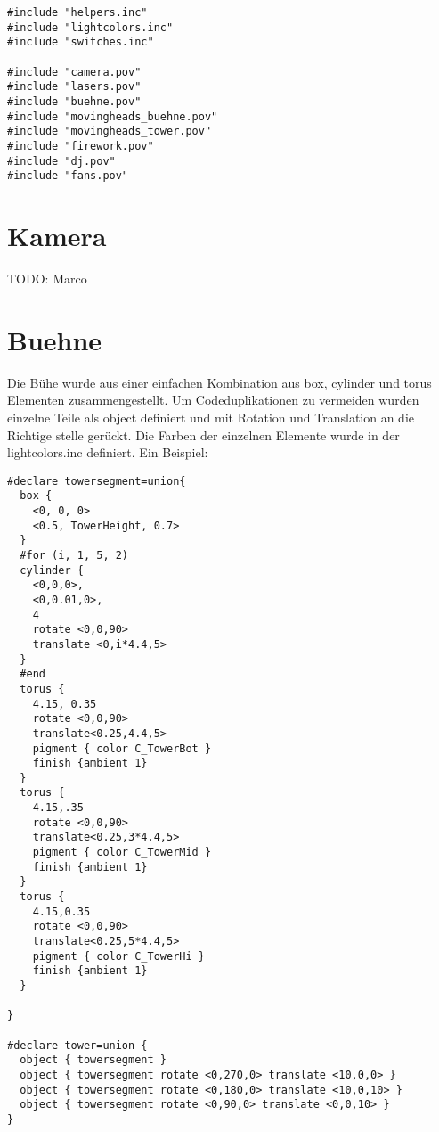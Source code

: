 \documentclass[paper=a4]{scrartcl}
\begin{document}
\begin{lstlisting}
#include "helpers.inc"
#include "lightcolors.inc"
#include "switches.inc"

#include "camera.pov"
#include "lasers.pov"
#include "buehne.pov"
#include "movingheads_buehne.pov"
#include "movingheads_tower.pov"
#include "firework.pov"
#include "dj.pov"
#include "fans.pov"
\end{lstlisting}

\section{Kamera}
TODO: Marco
\section{Buehne}
Die Bühe wurde aus einer einfachen Kombination aus box, cylinder und torus Elementen zusammengestellt. Um Codeduplikationen zu vermeiden wurden einzelne Teile als object definiert und mit Rotation und Translation an die Richtige stelle gerückt. Die Farben der einzelnen Elemente wurde in der lightcolors.inc definiert.
Ein Beispiel:
\begin{lstlisting}
#declare towersegment=union{
  box {
    <0, 0, 0>
    <0.5, TowerHeight, 0.7>
  }
  #for (i, 1, 5, 2)
  cylinder {
    <0,0,0>,
    <0,0.01,0>,
    4
    rotate <0,0,90>
    translate <0,i*4.4,5>
  }
  #end
  torus {
    4.15, 0.35
    rotate <0,0,90>
    translate<0.25,4.4,5>
    pigment { color C_TowerBot }
    finish {ambient 1}
  }
  torus {
    4.15,.35
    rotate <0,0,90>
    translate<0.25,3*4.4,5>
    pigment { color C_TowerMid }
    finish {ambient 1}
  }
  torus {
    4.15,0.35
    rotate <0,0,90>
    translate<0.25,5*4.4,5>
    pigment { color C_TowerHi }
    finish {ambient 1}
  }

}

#declare tower=union {
  object { towersegment }
  object { towersegment rotate <0,270,0> translate <10,0,0> }
  object { towersegment rotate <0,180,0> translate <10,0,10> }
  object { towersegment rotate <0,90,0> translate <0,0,10> }
}


\end{lstlisting}
\end{document}
